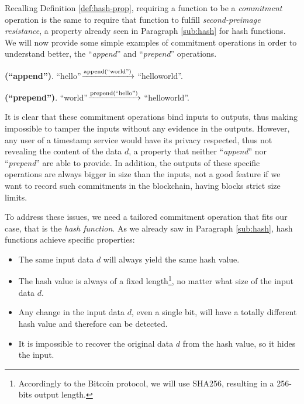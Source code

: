 \bigskip
\noindent
Recalling Definition \ref{def:hash-prop}, requiring a function to be a \textit{commitment} operation is the same to require that function to fulfill \textit{second-preimage resistance}, a property already seen in Paragraph \ref{sub:hash} for hash functions. We will now provide some simple examples of commitment operations in order to understand better, the \enquote{\textit{append}} and \enquote{\textit{prepend}} operations.
\begin{myexample}{\bf (\enquote{append})}.
    \textquotedblleft hello\textquotedblright $\xrightarrow{\text{append(\textquotedblleft world\textquotedblright)}}$ \textquotedblleft helloworld\textquotedblright.
\end{myexample}
\begin{myexample}{\bf (\enquote{prepend})}.
    \textquotedblleft world\textquotedblright $\xrightarrow{\text{prepend(\textquotedblleft hello\textquotedblright)}}$ \textquotedblleft helloworld\textquotedblright.
\end{myexample}

\bigskip
\noindent
It is clear that these commitment operations bind inputs to outputs, thus making impossible to tamper the inputs without any evidence in the outputs. However, any user of a timestamp service would have its privacy respected, thus not revealing the content of the data $d$, a property that neither \enquote{\textit{append}} nor \enquote{\textit{prepend}} are able to provide. In addition, the outputs of these specific operations are always bigger in size than the inputs, not a good feature if we want to record such commitments in the blockchain, having blocks strict size limits.

\bigskip
\noindent
To address these issues, we need a tailored commitment operation that fits our case, that is the \textit{hash function}. As we already saw in Paragraph \ref{sub:hash}, hash functions achieve specific properties:
\begin{itemize}
    \item The same input data $d$ will always yield the same hash value.
    \item The hash value is always of a fixed length\footnote{Accordingly to the Bitcoin protocol, we will use SHA256, resulting in a 256-bits output length.}, no matter what size of the input data $d$.
    \item Any change in the input data $d$, even a single bit, will have a totally different hash value and therefore can be detected.
    \item It is impossible to recover the original data $d$ from the hash value, so it hides the input.
\end{itemize}

